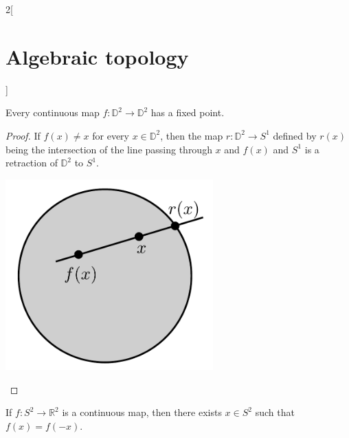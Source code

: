 \documentclass[../../../main.tex]{subfiles}
\begin{document}
\begin{multicols}{2}[\section{Algebraic topology}]

	\begin{theorem}[Brower 1910]
		\label{Brower}
		Every continuous map $f:\mathbb{D}^2 \to \mathbb{D}^2$ has a fixed point. 
	\end{theorem}

	\begin{proof}
		
		\begin{minipage}{0.3\textwidth}
			If $f(x)\neq x$ for every $x\in \mathbb{D}^2$, then the map $r: \mathbb{D}^2 \to S^1$ defined by $r(x)$ being the intersection of the line passing through $x$ and $f(x)$ and $S^1$ is a retraction of $\mathbb{D}^2$ to $S^1$.
		\end{minipage}
		\begin{minipage}{0.2\textwidth}
			\begin{center}
				\includegraphics[width=0.6\textwidth]{Images/Brower.pdf}
			\end{center}
		\end{minipage}

	\end{proof}
	
	

	\begin{theorem}
		If $f:S^2 \to \mathbb{R}^2$ is a continuous map, then there exists $x\in S^2$ such that $f(x)=f(-x)$.
	\end{theorem}
	
	
\end{multicols}
\end{document}
